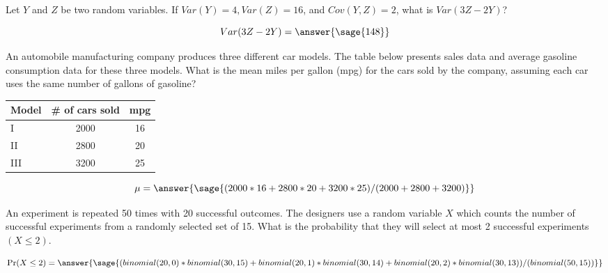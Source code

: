 \documentclass{ximera}
\begin{document}
\begin{problem}
Let $Y$ and $Z$ be two random variables. If $Var(Y) = 4, Var(Z) = 16 $, and $Cov(Y,Z) = 2$, what is $Var(3Z-2Y)$?

\begin{prompt}
$$
Var(3Z-2Y)=\answer{\sage{148}}
$$
\end{prompt}

\end{problem}

\begin{problem}
An automobile manufacturing company produces three different car models. The table below presents sales data and average gasoline consumption data for these three models. What is the mean miles per gallon (mpg) for the cars sold by the company, assuming each car uses the same number of gallons of gasoline?

\begin{tabular}[hc]{l|c|c}
Model & \# of cars sold & mpg \\
\hline
I & 2000 & 16 \\
\hline
II & 2800 & 20 \\
\hline
III & 3200 & 25 \\
\end{tabular}
\begin{prompt}
$$
\mu=\answer{\sage{(2000*16+2800*20+3200*25)/(2000+2800+3200)}}
$$
\end{prompt}

\end{problem}

\begin{problem}
An experiment is repeated 50 times with 20 successful outcomes. The designers use a random variable $X$ which counts the number of successful experiments from a randomly selected set of 15. What is the probability that they will select at most 2 successful experiments $(X\leq 2)$.  
\begin{prompt}
$$
\Pr(X\leq 2)=\answer{\sage{(binomial(20,0)*binomial(30,15)+binomial(20,1)*binomial(30,14)+binomial(20,2)*binomial(30,13))/(binomial(50,15))}}
$$
\end{prompt}

\end{problem}
\end{document}
